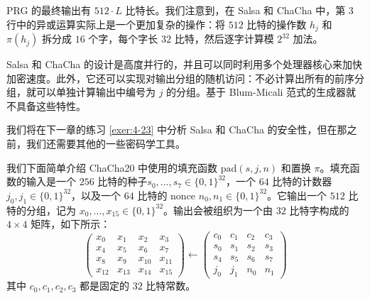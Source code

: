 \vspace*{10pt}

\noindent
PRG 的最终输出有 $512\cdot L$ 比特长。我们注意到，在 Salsa 和 ChaCha 中，第 $3$ 行中的异或运算实际上是一个更加复杂的操作：将 $512$ 比特的操作数 $h_j$ 和 $\pi(h_j)$ 拆分成 $16$ 个字，每个字长 $32$ 比特，然后逐字计算模 $2^{32}$ 加法。

Salsa 和 ChaCha 的设计是高度并行的，并且可以同时利用多个处理器核心来加快加密速度。此外，它还可以实现对输出分组的随机访问：不必计算出所有的前序分组，就可以单独计算输出中编号为 $j$ 的分组。基于 Blum-Micali 范式的生成器就不具备这些特性。

我们将在下一章的练习 \ref{exer:4-23} 中分析 Salsa 和 ChaCha 的安全性，但在那之前，我们还需要其他的一些密码学工具。

\begin{snote}[实现细节。]
我们下面简单介绍 ChaCha20 中使用的填充函数 $\mathrm{pad}(s,j,n)$ 和置换 $\pi$。填充函数的输入是一个 $256$ 比特的种子$s_0,\dots,s_7\in\{0,1\}^{32}$，一个 $64$ 比特的计数器 $j_0,j_1\in\{0,1\}^{32}$，以及一个 $64$ 比特的 nonce $n_0,n_1\in\{0,1\}^{32}$。它输出一个 $512$ 比特的分组，记为 $x_0,\dots,x_{15}\in\{0,1\}^{32}$。输出会被组织为一个由 $32$ 比特字构成的 $4\times4$ 矩阵，如下所示：
\begin{equation}
\begin{pmatrix}
x_0 & x_1 & x_2 & x_3 \\
x_4 & x_5 & x_6 & x_7 \\
x_8 & x_9 & x_{10} & x_{11} \\
x_{12} & x_{13} & x_{14} & x_{15}
\end{pmatrix}
\longleftarrow
\begin{pmatrix}
c_0 & c_1 & c_2 & c_3 \\
s_0 & s_1 & s_2 & s_3 \\
s_4 & s_5 & s_6 & s_7 \\
j_0 & j_1 & n_0 & n_1
\end{pmatrix}
\end{equation}
其中 $c_0,c_1,c_2,c_3$ 都是固定的 $32$ 比特常数。


\end{snote}
